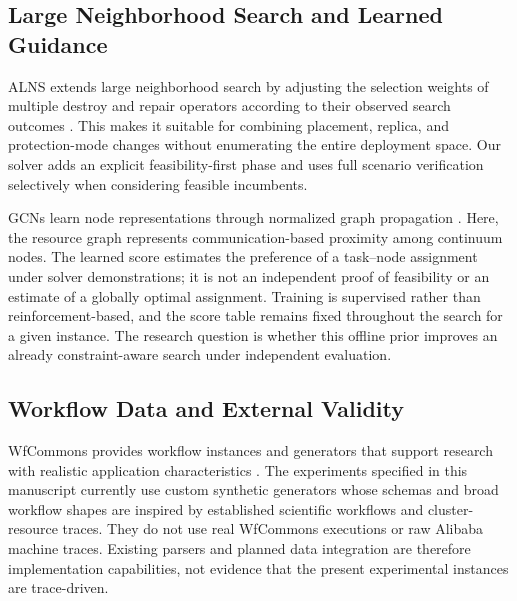 \subsection{Large Neighborhood Search and Learned Guidance}
ALNS extends large neighborhood search by adjusting the selection weights of
multiple destroy and repair operators according to their observed search
outcomes \cite{ropke2006alns,pisinger2007general}. This makes it suitable for
combining placement, replica, and protection-mode changes without enumerating
the entire deployment space. Our solver adds an explicit feasibility-first
phase and uses full scenario verification selectively when considering
feasible incumbents.

GCNs learn node representations through normalized graph propagation
\cite{kipf2017gcn}. Here, the resource graph represents communication-based
proximity among continuum nodes. The learned score estimates the preference
of a task--node assignment under solver demonstrations; it is not an
independent proof of feasibility or an estimate of a globally optimal
assignment. Training is supervised rather than reinforcement-based, and the
score table remains fixed throughout the search for a given instance. The
research question is whether this offline prior improves an already
constraint-aware search under independent evaluation.

\subsection{Workflow Data and External Validity}
WfCommons provides workflow instances and generators that support research
with realistic application characteristics \cite{coleman2022wfcommons}.
The experiments specified in this manuscript currently use custom synthetic
generators whose schemas and broad workflow shapes are inspired by
established scientific workflows and cluster-resource traces. They do not use
real WfCommons executions or raw Alibaba machine traces. Existing parsers and
planned data integration are therefore implementation capabilities, not
evidence that the present experimental instances are trace-driven.
